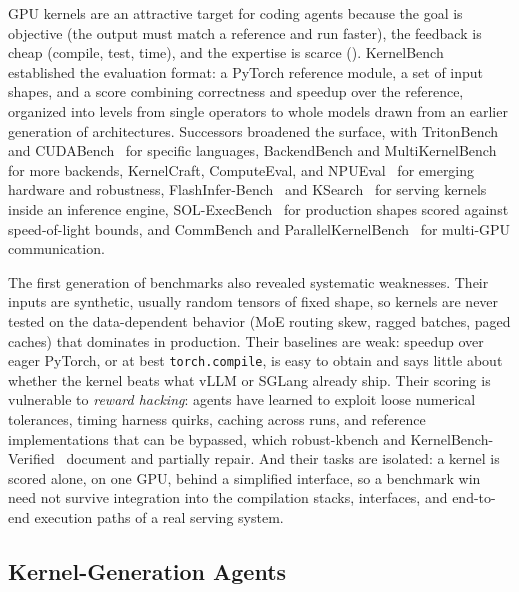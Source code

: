 GPU kernels are an attractive target for coding agents because the goal is objective (the output must match a reference and run faster), the feedback is cheap (compile, test, time), and the expertise is scarce ().
KernelBench~\cite{kernelbench} established the evaluation format: a PyTorch reference module, a set of input shapes, and a score combining correctness and speedup over the reference, organized into levels from single operators to whole models drawn from an earlier generation of architectures.
Successors broadened the surface, with TritonBench and CUDABench~\cite{tritonbench,cudabench} for specific languages, BackendBench and MultiKernelBench~\cite{backendbench,multikernelbench} for more backends, KernelCraft, ComputeEval, and NPUEval~\cite{kernelcraft,nvidia2025computeeval,kalade2025npueval} for emerging hardware and robustness, FlashInfer-Bench~\cite{flashinferbench,xing2026flashinferbench} and KSearch~\cite{cao2026ksearch} for serving kernels inside an inference engine, SOL-ExecBench~\cite{solexecbench} for production shapes scored against speed-of-light bounds, and CommBench and ParallelKernelBench~\cite{commbench,parallelkernelbench} for multi-GPU communication.

The first generation of benchmarks also revealed systematic weaknesses.
Their inputs are synthetic, usually random tensors of fixed shape, so kernels are never tested on the data-dependent behavior (MoE routing skew, ragged batches, paged caches) that dominates in production.
Their baselines are weak: speedup over eager PyTorch, or at best \texttt{torch.compile}, is easy to obtain and says little about whether the kernel beats what vLLM or SGLang already ship.
Their scoring is vulnerable to \emph{reward hacking}: agents have learned to exploit loose numerical tolerances, timing harness quirks, caching across runs, and reference implementations that can be bypassed, which robust-kbench and KernelBench-Verified~\cite{robustkbench,zhang2026kernelbenchverified} document and partially repair.
And their tasks are isolated: a kernel is scored alone, on one GPU, behind a simplified interface, so a benchmark win need not survive integration into the compilation stacks, interfaces, and end-to-end execution paths of a real serving system.

\subsection{Kernel-Generation Agents}
\label{background:subsec:kernel_agents}

